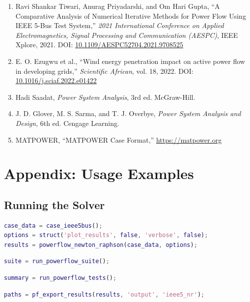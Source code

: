 \documentclass[12pt,a4paper]{article}
\begin{document}
\begin{enumerate}
    \item Ravi Shankar Tiwari, Anurag Priyadarshi, and Om Hari Gupta, ``A Comparative Analysis of Numerical Iterative Methods for Power Flow Using IEEE 5-Bus Test System,'' \textit{2021 International Conference on Applied Electromagnetics, Signal Processing and Communication (AESPC)}, IEEE Xplore, 2021. DOI: \href{https://doi.org/10.1109/AESPC52704.2021.9708525}{10.1109/AESPC52704.2021.9708525}
    
    \item E. O. Ezugwu et al., ``Wind energy penetration impact on active power flow in developing grids,'' \textit{Scientific African}, vol. 18, 2022. DOI: \href{https://doi.org/10.1016/j.sciaf.2022.e01422}{10.1016/j.sciaf.2022.e01422}
    
    \item Hadi Saadat, \textit{Power System Analysis}, 3rd ed. McGraw-Hill.
    
    \item J. D. Glover, M. S. Sarma, and T. J. Overbye, \textit{Power System Analysis and Design}, 6th ed. Cengage Learning.
    
    \item MATPOWER, ``MATPOWER Case Format,'' \href{https://matpower.org}{https://matpower.org}
\end{enumerate}

\section*{Appendix: Usage Examples}

\subsection*{Running the Solver}

\begin{lstlisting}[language=Matlab, caption={Basic Newton-Raphson solve}]
case_data = case_ieee5bus();
options = struct('plot_results', false, 'verbose', false);
results = powerflow_newton_raphson(case_data, options);
\end{lstlisting}

\begin{lstlisting}[language=Matlab, caption={Running the full comparison suite}]
suite = run_powerflow_suite();
\end{lstlisting}

\begin{lstlisting}[language=Matlab, caption={Running automated tests}]
summary = run_powerflow_tests();
\end{lstlisting}

\begin{lstlisting}[language=Matlab, caption={Exporting results}]
paths = pf_export_results(results, 'output', 'ieee5_nr');
\end{lstlisting}
\end{document}
